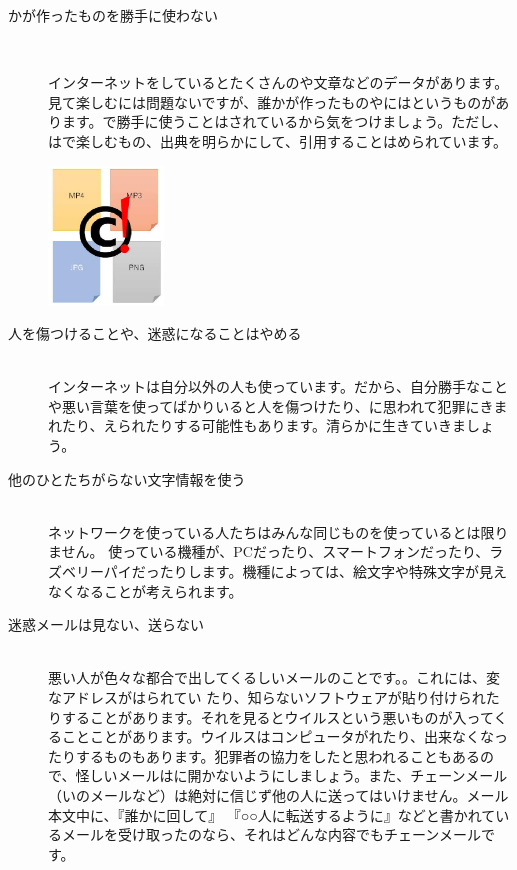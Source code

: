 \documentclass[a4paper,12pt,dvipdfmx]{jarticle}
\begin{document}
\begin{description}


	\item[かが作ったものを勝手に使わない]~\\
	\begin{minipage}[b]{0.6\textwidth}
		インターネットをしているとたくさんのや文章などのデータがあります。見て楽しむには問題ないですが、誰かが作ったものやにはというものがあります。で勝手に使うことはされているから気をつけましょう。ただし、はで楽しむもの、出典を明らかにして、引用することはめられています。
	\end{minipage}\hfill
	\includegraphics[width=0.25\textwidth]{ome7-img001}
	\item[人を傷つけることや、迷惑になることはやめる]~\\
	インターネットは自分以外の人も使っています。だから、自分勝手なことや悪い言葉を使ってばかりいると人を傷つけたり、に思われて犯罪にきまれたり、えられたりする可能性もあります。清らかに生きていきましょう。
	\item[他のひとたちがらない文字情報を使う]~\\
	ネットワークを使っている人たちはみんな同じものを使っているとは限りません。
	使っている機種が、PCだったり、スマートフォンだったり、ラズベリーパイだったりします。機種によっては、絵文字や特殊文字が見えなくなることが考えられます。
	\item[迷惑メールは見ない、送らない]~\\
	悪い人が色々な都合で出してくるしいメールのことです。。これには、変なアドレスがはられてい
	たり、知らないソフトウェアが貼り付けられたりすることがあります。それを見るとウイルスという悪いものが入ってくることことがあります。ウイルスはコンピュータがれたり、出来なくなったりするものもあります。犯罪者の協力をしたと思われることもあるので、怪しいメールはに開かないようにしましょう。また、チェーンメール（いのメールなど）は絶対に信じず他の人に送ってはいけません。メール本文中に、『誰かに回して』 『○○人に転送するように』などと書かれているメールを受け取ったのなら、それはどんな内容でもチェーンメールです。

\end{description}
\end{document}
